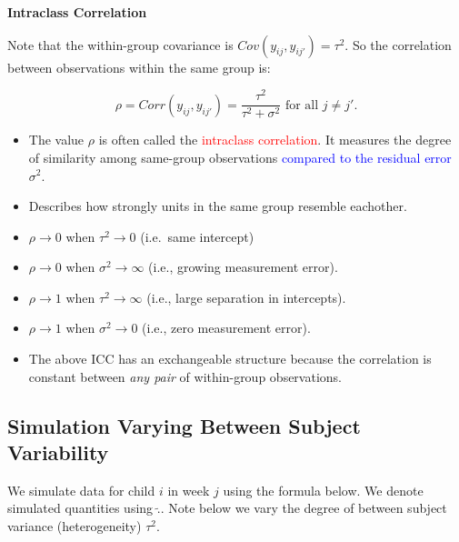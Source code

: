 \documentclass[
  letterpaper,
  DIV=11,
  numbers=noendperiod]{scrreprt}
\providecommand{\tightlist}{%
  \setlength{\itemsep}{0pt}\setlength{\parskip}{0pt}}\usepackage{longtable,booktabs,array}
\begin{document}
\begin{tcolorbox}[enhanced jigsaw, rightrule=.15mm, breakable, left=2mm, colframe=quarto-callout-note-color-frame, opacityback=0, leftrule=.75mm, toprule=.15mm, colback=white, arc=.35mm, bottomrule=.15mm]

\textbf{Intraclass Correlation}\vspace{2mm}

Note that the within-group covariance is
\(Cov(y_{ij}, y_{ij'}) = \tau^2\). So the correlation between
observations within the same group is:

\[
\rho = Corr(y_{ij}, y_{ij'}) = \frac{\tau^2}{\tau^2 + \sigma^2} \text{ for all }j \neq j'. 
\]

\begin{itemize}
\tightlist
\item
  The value \(\rho\) is often called the
  \textcolor{red}{intraclass correlation}. It measures the degree of
  similarity among same-group observations
  \textcolor{blue}{compared to the residual error} \(\sigma^2\).
\item
  Describes how strongly units in the same group resemble eachother.
\item
  \(\rho \rightarrow 0\) when \(\tau^2 \rightarrow 0\) (i.e.~same
  intercept)
\item
  \(\rho \rightarrow 0\) when \(\sigma^2 \rightarrow \infty\) (i.e.,
  growing measurement error).
\item
  \(\rho \rightarrow 1\) when \(\tau^2 \rightarrow \infty\) (i.e., large
  separation in intercepts).
\item
  \(\rho \rightarrow 1\) when \(\sigma^2 \rightarrow 0\) (i.e., zero
  measurement error).
\item
  The above ICC has an exchangeable structure because the correlation is
  constant between \emph{any pair} of within-group observations.
\end{itemize}

\end{tcolorbox}

\hypertarget{simulation-varying-between-subject-variability}{%
\subsection*{Simulation Varying Between Subject
Variability}\label{simulation-varying-between-subject-variability}}

We simulate data for child \(i\) in week \(j\) using the formula below.
We denote simulated quantities using \(\tilde{.}\). Note below we vary
the degree of between subject variance (heterogeneity) \(\tau^2\).
\end{document}
